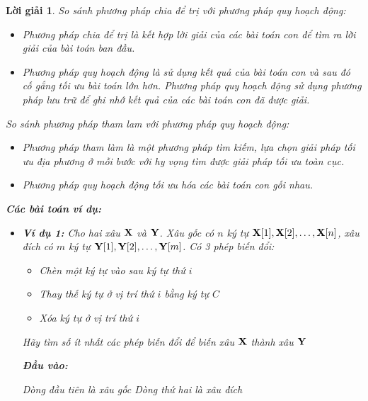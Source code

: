 \documentclass[14pt, a4paper]{article}
\theoremstyle{sltheorem}
\theoremstyle{soltheorem}
\newtheorem*{loigiai}{Lời giải}
\begin{document}
\begin{loigiai}
        So sánh phương pháp chia để trị với phương pháp quy hoạch động:

        \begin{itemize}
            \item Phương pháp chia để trị là kết hợp lời giải của các bài toán con để tìm ra lời giải của bài toán ban đầu.
            \item Phương pháp quy hoạch động là sử dụng kết quả của bài toán con và sau đó cố gắng tối ưu bài toán lớn hơn.
            Phương pháp quy hoạch động sử dụng phương pháp lưu trữ để ghi nhớ kết quả của các bài toán con đã được giải.
        \end{itemize}

        So sánh phương pháp tham lam với phương pháp quy hoạch động:

        \begin{itemize}
            \item Phương pháp tham làm là một phương pháp tìm kiếm, lựa chọn giải pháp tối ưu địa phương ở mỗi bước với hy vọng tìm được giải pháp tối ưu toàn cục.
            \item Phương pháp quy hoạch động tối ưu hóa các bài toán con gối nhau.
        \end{itemize}

        \textbf{Các bài toán ví dụ:}

        \begin{itemize} [label={$-$}]
            \item \textbf{Ví dụ 1:}
            Cho hai xâu $\bold{X}$ và $\bold{Y}$. Xâu gốc có $n$ ký tự $\bold{X} \lbrack 1 \rbrack, \bold{X} \lbrack 2 \rbrack, \dots, \bold{X} \lbrack n \rbrack$, xâu đích có $m$ ký tự $\bold{Y} \lbrack 1 \rbrack, \bold{Y} \lbrack 2 \rbrack, \dots, \bold{Y} \lbrack m \rbrack$.
            Có 3 phép biến đổi:
            \begin{itemize} [label={$+$}]
                \item Chèn một ký tự vào sau ký tự thứ $i$
                \item Thay thế ký tự ở vị trí thứ $i$ bằng ký tự $C$
                \item Xóa ký tự ở vị trí thứ $i$
            \end{itemize}
            Hãy tìm số ít nhất các phép biến đổi để biến xâu $\bold{X}$ thành xâu $\bold{Y}$

            \textbf{Đầu vào:}

            Dòng đầu tiên là xâu gốc
            Dòng thứ hai là xâu đích
            

\end{itemize}
\end{loigiai}
\end{document}
